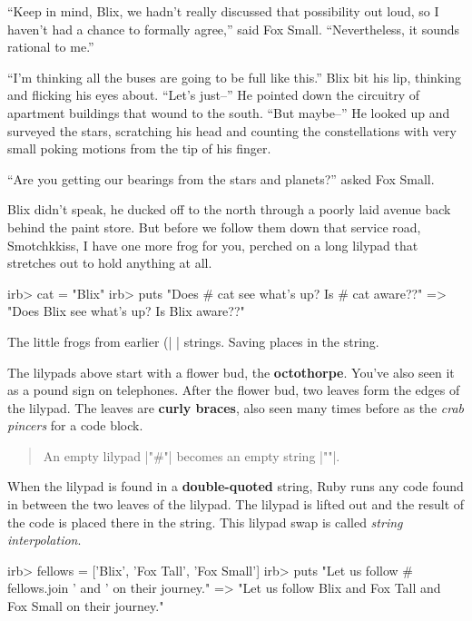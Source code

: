 \documentclass[12pt,twoside]{report}
\begin{document}
``Keep in mind, Blix, we hadn't really discussed that possibility out
loud, so I haven't had a chance to formally agree,'' said Fox Small.
``Nevertheless, it sounds rational to me.''

``I'm thinking all the buses are going to be full like this.''  Blix
bit his lip, thinking and flicking his eyes about.  ``Let's just--''
He pointed down the circuitry of apartment buildings that wound to the
south.  ``But maybe--'' He looked up and surveyed the stars,
scratching his head and counting the constellations with very small
poking motions from the tip of his finger.

``Are you getting our bearings from the stars and planets?'' asked Fox
Small.

Blix didn't speak, he ducked off to the north through a poorly laid
avenue back behind the paint store. But before we follow them down
that service road, Smotchkkiss, I have one more frog for you, perched
on a long lilypad that stretches out to hold anything at all.


\begin{consolecode}

 irb> cat = "Blix"
 irb> puts "Does #{ cat } see what's up?  Is #{ cat } aware??"
   => "Does Blix see what's up?  Is Blix aware??"

\end{consolecode}


The little frogs from earlier (\rubyinline|%
\rubyinline|%
strings.  Saving places in the string.

The lilypads above start with a flower bud, the {\bf octothorpe}.
You've also seen it as a pound sign on telephones.  After the flower
bud, two leaves form the edges of the lilypad.  The leaves are {\bf
  curly braces}, also seen many times before as the {\em crab pincers}
for a code block.

\begin{quote}
An empty lilypad \rubyinline|"#{}"| becomes an empty
string \rubyinline|""|.\end{quote}


When the lilypad is found in a {\bf double-quoted} string, Ruby runs
any code found in between the two leaves of the lilypad.  The lilypad
is lifted out and the result of the code is placed there in the
string.  This lilypad swap is called {\em string interpolation}.


\begin{consolecode}

 irb> fellows = ['Blix', 'Fox Tall', 'Fox Small']
 irb> puts "Let us follow #{ fellows.join ' and ' } on their journey."
   => "Let us follow Blix and Fox Tall and Fox Small on their journey."

\end{consolecode}
\end{document}
